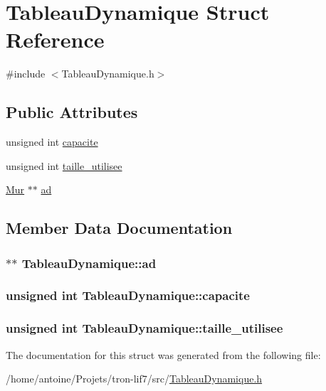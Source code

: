 \hypertarget{structTableauDynamique}{\section{Tableau\-Dynamique Struct Reference}
\label{structTableauDynamique}
}


{\ttfamily \#include $<$Tableau\-Dynamique.\-h$>$}

\subsection*{Public Attributes}
\begin{DoxyCompactItemize}
\item 
unsigned int \hyperlink{structTableauDynamique_a7ddd455f3dc2f3d94093177025945936}{capacite}
\item 
unsigned int \hyperlink{structTableauDynamique_ae55063c3127e7ee9390e572fb0ed3a58}{taille\-\_\-utilisee}
\item 
\hyperlink{structMur}{Mur} $\ast$$\ast$ \hyperlink{structTableauDynamique_a2cf8c9cea81ed90bb3bb53e0a01a3655}{ad}
\end{DoxyCompactItemize}


\subsection{Member Data Documentation}
\hypertarget{structTableauDynamique_a2cf8c9cea81ed90bb3bb53e0a01a3655}{
\subsubsection[{ad}]{$\ast$$\ast$ Tableau\-Dynamique\-::ad}}\label{structTableauDynamique_a2cf8c9cea81ed90bb3bb53e0a01a3655}
\hypertarget{structTableauDynamique_a7ddd455f3dc2f3d94093177025945936}{
\subsubsection[{capacite}]{\setlength{\rightskip}{0pt plus 5cm}unsigned int Tableau\-Dynamique\-::capacite}}\label{structTableauDynamique_a7ddd455f3dc2f3d94093177025945936}
\hypertarget{structTableauDynamique_ae55063c3127e7ee9390e572fb0ed3a58}{
\subsubsection[{taille\-\_\-utilisee}]{\setlength{\rightskip}{0pt plus 5cm}unsigned int Tableau\-Dynamique\-::taille\-\_\-utilisee}}\label{structTableauDynamique_ae55063c3127e7ee9390e572fb0ed3a58}


The documentation for this struct was generated from the following file\-:\begin{DoxyCompactItemize}
\item 
/home/antoine/\-Projets/tron-\/lif7/src/\hyperlink{TableauDynamique_8h}{Tableau\-Dynamique.\-h}\end{DoxyCompactItemize}
